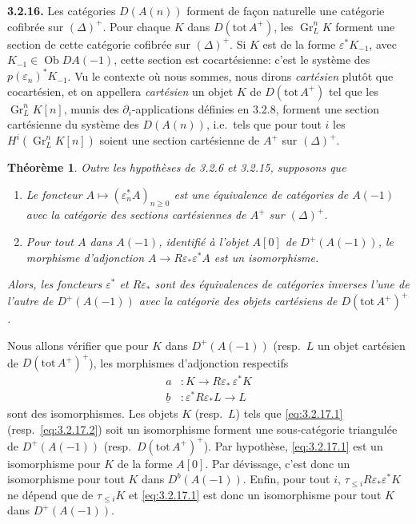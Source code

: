 \documentclass[12pt,a4paper]{article}
\theoremstyle{plain}
\newtheorem{theorem}{Th\'{e}or\`{e}me}[section]
\theoremstyle{definition}
\DeclareMathOperator{\Gr}{Gr}
\DeclareMathOperator{\Ob}{Ob}
\begin{document}
\noindent\textbf{3.2.16.} Les cat\'{e}gories $D(A(n))$ forment de fa\c{c}on naturelle une cat\'{e}gorie cofibr\'{e}e sur $(\Delta)^{+}$. Pour chaque $K$ dans $D(\mathrm{tot}\, A^{+})$, les $\Gr^{n}_{L}K$ forment une section de cette cat\'{e}gorie cofibr\'{e}e sur $(\Delta)^{+}$. Si $K$ est de la forme $\varepsilon^{*}K_{-1}$, avec $K_{-1} \in \Ob DA(-1)$, cette section est cocart\'{e}sienne: c'est le syst\`{e}me des $p(\varepsilon_{n})^{*}K_{-1}$. Vu le contexte o\`{u} nous sommes, nous dirons \emph{cart\'{e}sien} plut\^{o}t que cocart\'{e}sien, et on appellera \emph{cart\'{e}sien} un objet $K$ de $D(\mathrm{tot}\, A^{+})$ tel que les $\Gr^{n}_{L}K[n]$, munis des $\partial_{i}$-applications d\'{e}finies en 3.2.8, forment une section cart\'{e}sienne du syst\`{e}me des $D(A(n))$, i.e.\ tels que pour tout $i$ les $H^{i}(\Gr^{n}_{L}K[n])$ soient une section cart\'{e}sienne de $A^{+}$ sur $(\Delta)^{+}$.

\begin{theorem}\label{thm:3.2.17}
Outre les hypoth\`{e}ses de \emph{3.2.6} et \emph{3.2.15}, supposons que
\begin{enumerate}
\item[(a)] Le foncteur $A \longmapsto (\varepsilon_{n}^{*}A)_{n \geq 0}$ est une \'{e}quivalence de cat\'{e}gories de $A(-1)$ avec la cat\'{e}gorie des sections cart\'{e}siennes de $A^{+}$ sur $(\Delta)^{+}$.
\item[(b)] Pour tout $A$ dans $A(-1)$, identifi\'{e} \`{a} l'objet $A[0]$ de $D^{+}(A(-1))$, le morphisme d'adjonction $A \longrightarrow R\varepsilon_{*}\varepsilon^{*}A$ est un isomorphisme.
\end{enumerate}
Alors, les foncteurs $\varepsilon^{*}$ et $R\varepsilon_{*}$ sont des \'{e}quivalences de cat\'{e}gories inverses l'une de l'autre de $D^{+}(A(-1))$ avec la cat\'{e}gorie des objets cart\'{e}siens de $D(\mathrm{tot}\, A^{+})^{+}$.
\end{theorem}

Nous allons v\'{e}rifier que pour $K$ dans $D^{+}(A(-1))$ (resp.\ $L$ un objet cart\'{e}sien de $D(\mathrm{tot}\, A^{+})^{+}$), les morphismes d'adjonction respectifs
\begin{align}
\label{eq:3.2.17.1} a &: K \longrightarrow R\varepsilon_{*}\,\varepsilon^{*}K \\
\label{eq:3.2.17.2} \underline{b} &: \varepsilon^{*}R\varepsilon_{*}L \longrightarrow L
\end{align}
sont des isomorphismes. Les objets $K$ (resp.\ $L$) tels que \eqref{eq:3.2.17.1} (resp.\ \eqref{eq:3.2.17.2}) soit un isomorphisme forment une sous-cat\'{e}gorie triangul\'{e}e de $D^{+}(A(-1))$ (resp.\ $D(\mathrm{tot}\, A^{+})^{+}$). Par hypoth\`{e}se, \eqref{eq:3.2.17.1} est un isomorphisme pour $K$ de la forme $A[0]$. Par d\'{e}vissage, c'est donc un isomorphisme pour tout $K$ dans $D^{b}(A(-1))$. Enfin, pour tout $i$, $\tau_{\leq i}R\varepsilon_{*}\varepsilon^{*}K$ ne d\'{e}pend que de $\tau_{\leq i}K$ et \eqref{eq:3.2.17.1} est donc un isomorphisme pour tout $K$ dans $D^{+}(A(-1))$.
\end{document}
